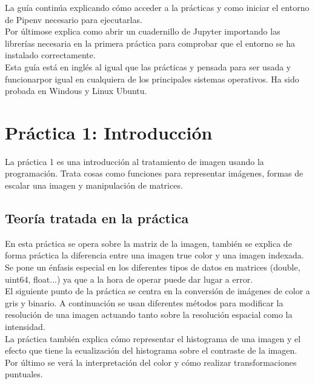 \documentclass[a4paper,12pt]{report}
\begin{document}
La guía continúa explicando cómo acceder a la prácticas y como iniciar el entorno de Pipenv necesario para ejecutarlas.\\

Por últimose explica como abrir un cuadernillo de Jupyter importando las librerías necesaria en la primera práctica para comprobar que el entorno se ha instalado correctamente.\\

Esta guía está en inglés al igual que las prácticas y pensada para ser usada y funcionarpor igual en cualquiera de los principales sistemas operativos. Ha sido probada en Windous y Linux Ubuntu.\\

\section{ Práctica 1: Introducción}

La práctica 1 es una introducción al tratamiento de imagen usando la programación. Trata cosas como funciones para representar imágenes, formas de escalar una imagen y manipulación de matrices.\\

\subsection{Teoría tratada en la práctica}

En esta práctica se opera sobre la matriz de la imagen, también se explica de forma práctica la diferencia entre una imagen true color y una imagen indexada. Se pone un énfasis especial en los diferentes tipos de datos en matrices (double, uint64, float...) ya que a la hora de operar puede dar lugar a error.\\

El siguiente punto de la práctica se centra en la conversión de imágenes de color a gris y binario. A continuación se usan diferentes métodos para modificar la resolución de una imagen actuando tanto sobre la resolución espacial como la intensidad.\\

La práctica también explica cómo representar el histograma de una imagen y el efecto que tiene la ecualización del histograma sobre el contraste de la imagen.\\

Por último se verá la interpretación del color y cómo realizar transformaciones puntuales.\\
\end{document}
